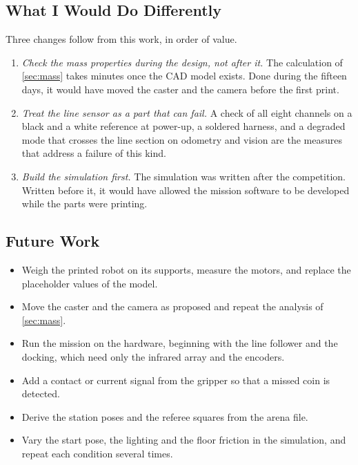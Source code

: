 \subsection{What I Would Do Differently}
Three changes follow from this work, in order of value.
\begin{enumerate}
  \item \emph{Check the mass properties during the design, not after it.} The calculation of
        \cref{sec:mass} takes minutes once the CAD model exists. Done during the fifteen
        days, it would have moved the caster and the camera before the first print.
  \item \emph{Treat the line sensor as a part that can fail.} A check of all eight channels
        on a black and a white reference at power-up, a soldered harness, and a degraded
        mode that crosses the line section on odometry and vision are the measures
        that address a failure of this kind.
  \item \emph{Build the simulation first.} The simulation was written after the competition.
        Written before it, it would have allowed the mission software to be developed
        while the parts were printing.
\end{enumerate}

\subsection{Future Work}
\begin{itemize}
  \item Weigh the printed robot on its supports, measure the motors, and replace the
        placeholder values of the model.
  \item Move the caster and the camera as proposed and repeat the analysis of \cref{sec:mass}.
  \item Run the mission on the hardware, beginning with the line follower and the docking,
        which need only the infrared array and the encoders.
  \item Add a contact or current signal from the gripper so that a missed coin is detected.
  \item Derive the station poses and the referee squares from the arena file.
  \item Vary the start pose, the lighting and the floor friction in the simulation, and
        repeat each condition several times.
\end{itemize}
